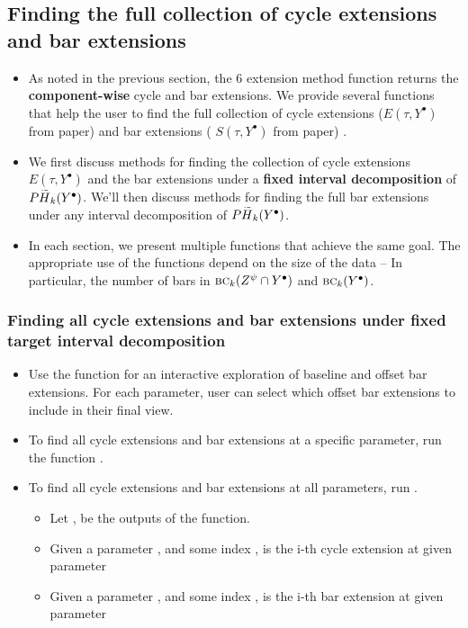 \documentclass{article}
\newcommand{\bc}{\text{\sc bc}}
\newcommand{\HH}{\smash{\widetilde{H}}}
\begin{document}
\subsection{Finding the full collection of cycle extensions and bar extensions}
\begin{itemize}
\item As noted in the previous section, the 6 extension method function returns the \textbf{component-wise} cycle and bar extensions. We provide several functions that help the user to find the full collection of cycle extensions ($E(\tau, Y^{\bullet})$ from paper) and bar extensions ( $S(\tau, Y^{\bullet})$ from paper) .
\item We first discuss methods for finding the collection of cycle extensions $E(\tau, Y^{\bullet})$ and the bar extensions under a \textbf{fixed interval decomposition} of $P\HH_k(Y^{\bullet})$. We'll then discuss methods for finding the full bar extensions under any interval decomposition of $P\HH_k(Y^{\bullet})$. 
\item In each section, we present multiple functions that achieve the same goal. The appropriate use of the functions depend on the size of the data -- In particular, the number of bars in $\bc_k(Z^{\psi} \cap Y^{\bullet})$ and $\bc_k(Y^{\bullet})$. 
\end{itemize}

\subsubsection{Finding all cycle extensions and bar extensions under fixed target interval decomposition}
\begin{itemize}
\item Use the function  for an interactive exploration of baseline and offset bar extensions. For each parameter, user can select which offset bar extensions to include in their final view. 
\item To find all cycle extensions and bar extensions at a specific parameter, run the function . 
\item To find all cycle extensions and bar extensions at all parameters, run .
	\begin{itemize}
	\item Let ,  be the outputs of the function.
	\item Given a parameter , and some index ,  is the i-th cycle extension at given parameter
	\item Given a parameter , and some index ,  is the i-th bar extension at given parameter
	\end{itemize}
\end{itemize}
\end{document}
